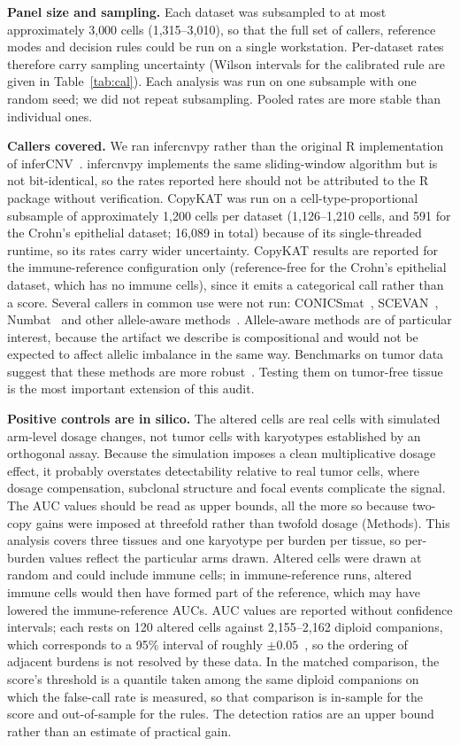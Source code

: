 \documentclass[11pt,letterpaper]{article}
\begin{document}
\textbf{Panel size and sampling.} Each dataset was subsampled to at most approximately 3{,}000 cells (1{,}315--3{,}010), so that the full set of callers, reference modes and decision rules could be run on a single workstation. Per-dataset rates therefore carry sampling uncertainty (Wilson intervals for the calibrated rule are given in Table~\ref{tab:cal}). Each analysis was run on one subsample with one random seed; we did not repeat subsampling. Pooled rates are more stable than individual ones.

\textbf{Callers covered.} We ran infercnvpy rather than the original R implementation of inferCNV~\cite{infercnv}. infercnvpy implements the same sliding-window algorithm but is not bit-identical, so the rates reported here should not be attributed to the R package without verification. CopyKAT was run on a cell-type-proportional subsample of approximately 1{,}200 cells per dataset (1{,}126--1{,}210 cells, and 591 for the Crohn's epithelial dataset; 16{,}089 in total) because of its single-threaded runtime, so its rates carry wider uncertainty. CopyKAT results are reported for the immune-reference configuration only (reference-free for the Crohn's epithelial dataset, which has no immune cells), since it emits a categorical call rather than a score. Several callers in common use were not run: CONICSmat~\cite{conics}, SCEVAN~\cite{scevan}, Numbat~\cite{numbat} and other allele-aware methods~\cite{casper,honeybadger}. Allele-aware methods are of particular interest, because the artifact we describe is compositional and would not be expected to affect allelic imbalance in the same way. Benchmarks on tumor data suggest that these methods are more robust~\cite{schmid2025,song2025}. Testing them on tumor-free tissue is the most important extension of this audit.

\textbf{Positive controls are in silico.} The altered cells are real cells with simulated arm-level dosage changes, not tumor cells with karyotypes established by an orthogonal assay. Because the simulation imposes a clean multiplicative dosage effect, it probably overstates detectability relative to real tumor cells, where dosage compensation, subclonal structure and focal events complicate the signal. The AUC values should be read as upper bounds, all the more so because two-copy gains were imposed at threefold rather than twofold dosage (Methods). This analysis covers three tissues and one karyotype per burden per tissue, so per-burden values reflect the particular arms drawn. Altered cells were drawn at random and could include immune cells; in immune-reference runs, altered immune cells would then have formed part of the reference, which may have lowered the immune-reference AUCs. AUC values are reported without confidence intervals; each rests on 120 altered cells against 2{,}155--2{,}162 diploid companions, which corresponds to a 95\% interval of roughly $\pm0.05$~\cite{hanley1982}, so the ordering of adjacent burdens is not resolved by these data. In the matched comparison, the score's threshold is a quantile taken among the same diploid companions on which the false-call rate is measured, so that comparison is in-sample for the score and out-of-sample for the rules. The detection ratios are an upper bound rather than an estimate of practical gain.
\end{document}

